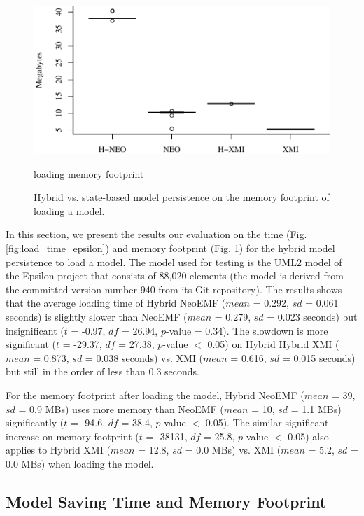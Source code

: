 \documentclass[10pt,conference]{IEEEtran}
\begin{document}
\begin{figure}[ht]
        \includegraphics[width=\linewidth]{images/load_memory_epsilon}
        \caption{loading memory footprint}
    \caption{Hybrid vs. state-based model persistence on the memory footprint of loading a model.}
\label{fig:load_memory_epsilon}
\end{figure}

In this section, we present the results our evaluation on the time (Fig. \ref{fig:load_time_epsilon}) and memory footprint (Fig. \ref{fig:load_memory_epsilon}) for the hybrid model persistence to load a model. The model used for testing is the UML2 model of the Epsilon project that consists of 88,020 elements (the model is derived from the committed version number 940 from its Git repository). The results shows that the average loading time of Hybrid NeoEMF ($mean$ = 0.292, $sd$ = 0.061 seconds) is slightly slower than NeoEMF ($mean$ = 0.279, $sd$ = 0.023 seconds) but insignificant ($t$ = -0.97, $df$ = 26.94, $p$-value = 0.34). The slowdown is more significant ($t$ = -29.37, $df$ = 27.38, $p$-value $<$ 0.05) on Hybrid Hybrid XMI ($mean$ = 0.873, $sd$ = 0.038 seconds) vs. XMI ($mean$ = 0.616, $sd$ = 0.015 seconds) but still in the order of less than 0.3 seconds.  

For the memory footprint after loading the model, Hybrid NeoEMF ($mean$ = 39, $sd$ = 0.9 MBs) uses more memory than NeoEMF ($mean$ = 10, $sd$ = 1.1 MBs) significantly ($t$ = -94.6, $df$ = 38.4, $p$-value $<$ 0.05). The similar significant increase on memory footprint ($t$ = -38131, $df$ = 25.8, $p$-value $<$ 0.05) also applies to Hybrid XMI ($mean$ = 12.8, $sd$ = 0.0 MBs) vs. XMI ($mean$ = 5.2, $sd$ = 0.0 MBs) when loading the model.  

\subsection{Model Saving Time and Memory Footprint}
\label{sec:model_saving_time}
\end{document}
